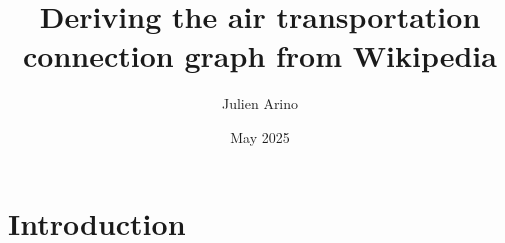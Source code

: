 \documentclass{article}
\title{Deriving the air transportation connection graph from Wikipedia}
\author{Julien Arino}
\date{May 2025}
\begin{document}
\maketitle

\section{Introduction}
\end{document}
